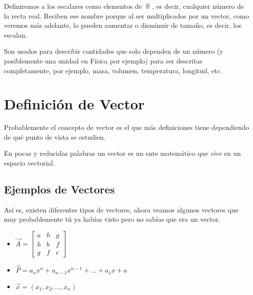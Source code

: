 \documentclass[12pt, fleqn]{report}                             %
\theoremstyle{break}                                            %
\DeclareMathOperator \Reals        {\mathbb{R}}                 %
\newcommand{\bVector}[1]                                        %
        { \ensuremath{\begin{bmatrix}#1\end{bmatrix}} }             %
\begin{document}
            Definiremos a los escalares como elementos de $\Reals$, es decir, cualquier número de
            la recta real.
            Reciben ese nombre porque al ser multiplicados por un vector, como veremos más adelante,
            lo pueden aumentar o disminuir de tamaño, es decir, los escalan.

            Son usados para describir cantidades que solo dependen de un número (y posiblemente una
            unidad en Física por ejemplo) para ser descritas completamente, por ejemplo, masa,
            volumen, temperatura, longitud, etc.


        \vspace{1em}
        \section{Definición de Vector}
        
            Probablemente el concepto de vector es el que más definiciones tiene dependiendo de qué
            punto de vista se estudien.

            En pocas y reducidas palabras un vector es un ente matem\'atico que \textsl{vive} 
            en un espacio vectorial. 

            \subsection{Ejemplos de Vectores}
                Así es, existen diferentes tipos de vectores, ahora veamos algunos 
                vectores que muy probablemente tú ya habías visto pero no sabías
                que era un vector.

                \begin{itemize}
                    
                    \item 
                        $
                        \vec{A} = \bVector{
                            a & h & g           \\
                            h & b & f           \\
                            g & f & c}
                        $

                    \item
                        $
                        \vec{P} = a_n x^n + a_{n-1} x^{n-1} + \dots + a_1 x + a     
                        $
                    
                    \item
                        $
                        \vec{x} = (x_1, x_2, \dots, x_n)
                        $

                \end{itemize}
  
\end{document}
